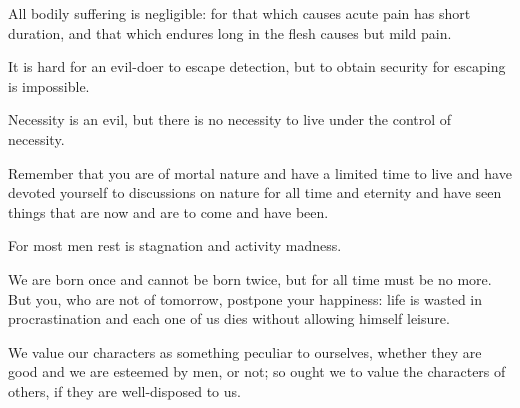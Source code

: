 \documentclass{stex}
\begin{document}

\begin{sparagraph}[title=4]
  All bodily suffering is negligible: for that which causes acute pain has short duration, and that which endures long in the flesh causes but mild pain.
\end{sparagraph}

\vspace{0.5em}
\begin{sparagraph}[title=7]
  It is hard for an evil-doer to escape detection, but to obtain security for escaping is impossible.
\end{sparagraph}

\vspace{0.5em}
\begin{sparagraph}[title=9]
  Necessity is an evil, but there is no necessity to live under the control of necessity.
\end{sparagraph}

\vspace{0.5em}
\begin{sparagraph}[title=10]
  Remember that you are of mortal nature and have a limited time to live and have devoted yourself to discussions on nature for all time and eternity and have seen things that are now and are to come and have been.
\end{sparagraph}

\vspace{0.5em}
\begin{sparagraph}[title=11]
  For most men rest is stagnation and activity madness.
\end{sparagraph}

\vspace{0.5em}
\begin{sparagraph}[title=14]
  We are born once and cannot be born twice, but for all time must be no more.
  But you, who are not  of tomorrow, postpone your happiness: life is wasted in procrastination and each one of us dies without allowing himself leisure.
\end{sparagraph}

\vspace{0.5em}
\begin{sparagraph}[title=15]
  We value our characters as something peculiar to ourselves, whether they are good and we are esteemed by men, or not; so ought we to value the characters of others, if they are well-disposed to us.
\end{sparagraph}
\end{document}
